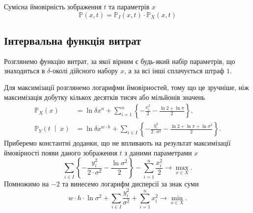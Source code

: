 Сумісна ймовірність зображення $t$ та параметрів $x$
\begin{equation*}
  \mathbb{P}\left( x, t \right)
  = \mathbb{P}_I\left( x, t \right) \cdot \mathbb{P}_X\left( x, t \right)
\end{equation*}

\subsection{Інтервальна функція витрат}

Розглянемо функцію витрат,
за якої вірним є будь-який набір параметрів,
що знаходиться в $\delta$-околі дійсного набору $x$,
а за всі інші сплачується штраф $1$.

Для максимізації розглянемо логарифми ймовірностей,
тому що це зручніше,
ніж максимізація добутку кількох десятків тисяч або мільйонів значень
\begin{equation*}
  \begin{split}
    \mathbb{P}_X\left( x \right)
    &= \ln{\delta x^n} +
        \sum_{i = 1}^n
        \left\{
          - \frac{x_i^2}{2}
          - \frac{\ln{2} + \ln{\pi}}{2}
        \right\}, \\
    \mathbb{P}_Y\left( t \;\middle|\; x \right)
    &= \ln{\delta x^{w \cdot h}} +
        \sum_{i \in I}
        \left\{
          - \frac{ y_i^2}{2 \cdot \sigma^2}
          - \frac{\ln{2} + \ln{\pi} + \ln{\sigma^2}}{2}
        \right\}.
  \end{split}
\end{equation*}
Приберемо константні доданки,
що не впливають на результат максимізації ймовірності
появи даного зображення $t$ з даними параметрами $x$
\begin{equation*}
  \sum_{i \in I}
    \left\{
      - \frac{ y_i^2}{2 \cdot \sigma^2}
      - \frac{\ln{\sigma^2}}{2}
    \right\}
  - \sum_{i = 1}^n \frac{x_i^2}{2}
  \to \max\limits_{x \in X}.
\end{equation*}
Помножимо на $-2$ та винесемо логарифм дисперсії за знак суми
\begin{equation}\label{eq:minimize}
  w \cdot h \cdot \ln{\sigma^2}
  + \sum_{i \in I} \frac{ y_i^2}{\sigma^2}
  + \sum_{i = 1}^n x_i^2
  \to \min\limits_{x \in X}.
\end{equation}

